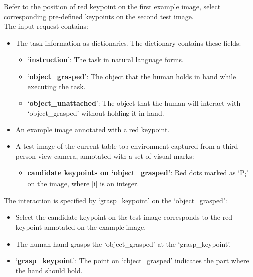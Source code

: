 \begin{center}
\begin{tcolorbox}[colback=gray!5, colframe=black!40, sharp corners=south, title= Grasp Point Transfer Prompt]\small

Refer to the position of red keypoint on the first example image, select corresponding pre-defined keypoints on the second test image. \\

The input request contains:  
\begin{itemize}
    \item The task information as dictionaries. The dictionary contains these fields: 
    \begin{itemize}
        \item `\textbf{instruction}': The task in natural language forms.
        \item `\textbf{object\_grasped}': The object that the human holds in hand while executing the task.
        \item `\textbf{object\_unattached}': The object that the human will interact with `object\_grasped' without holding it in hand.
    \end{itemize}
    \item An example image annotated with a red keypoint.
    \item A test image of the current table-top environment captured from a third-person view camera, annotated with a set of visual marks:
    \begin{itemize}
        \item \textbf{candidate keypoints on `object\_grasped'}: Red dots marked as `P\textsubscript{i}' on the image, where [i] is an integer. \\
    \end{itemize}
\end{itemize}

The interaction is specified by `grasp\_keypoint' on the `object\_grasped':
\begin{itemize}
    \item Select the candidate keypoint on the test image corresponds to the red keypoint annotated on the example image.
    \item The human hand grasps the `object\_grasped' at the `grasp\_keypoint’.
    \item `\textbf{grasp\_keypoint}': The point on `object\_grasped' indicates the part where the hand should hold. \\
\end{itemize}


\end{tcolorbox}
\end{center}
